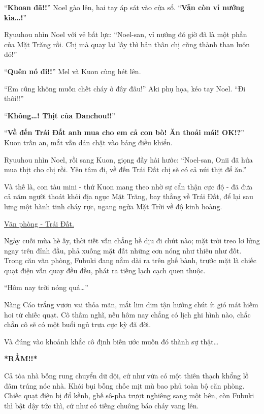 \documentclass[../main.tex]{subfiles}
\begin{document}
``\textbf{Khoan đã!!}'' Noel gào lên, hai tay áp sát vào cửa sổ. ``\textbf{Vẫn còn vỉ nướng kìa\dots!}''

Ryuuhou nhìn Noel với vẻ bất lực: ``Noel-san, vỉ nướng đó giờ đã là một phần của Mặt Trăng rồi. Chị mà quay lại lấy thì bản thân chị cũng thành than luôn đó!''

``\textbf{Quên nó đi!!}'' Mel và Kuon cùng hét lên.

``Em cũng không muốn chết cháy ở đây đâu!'' Aki phụ họa, kéo tay Noel. ``Đi thôi!!''

``\textbf{Không\dots! Thịt của Danchou!!}''

``\textbf{Về đến Trái Đất anh mua cho em cả con bò! Ăn thoải mái! OK!?}'' Kuon trấn an, mắt vẫn dán chặt vào bảng điều khiển.

Ryuuhou nhìn Noel, rồi sang Kuon, giọng đầy hài hước: ``Noel-san, Onii đã hứa mua thịt cho chị rồi. Yên tâm đi, về đến Trái Đất chị sẽ có cả núi thịt để ăn.''

Và thế là, con tàu mini - thứ Kuon mang theo nhờ sự cẩn thận cực độ - đã đưa cả năm người thoát khỏi địa ngục Mặt Trăng, bay thẳng về Trái Đất, để lại sau lưng một hành tinh cháy rực, ngang ngửa Mặt Trời về độ kinh hoàng.

\begin{center}
  \uline{Văn phòng - Trái Đất.}
\end{center}

Ngày cuối mùa hè ấy, thời tiết vẫn chẳng hề dịu đi chút nào; mặt trời treo lơ lửng ngay trên đỉnh đầu, phả xuống mặt đất những cơn nóng như thiêu như đốt. Trong căn văn phòng, Fubuki đang nằm dài ra trên ghế bành, trước mặt là chiếc quạt điện vẫn quay đều đều, phát ra tiếng lạch cạch quen thuộc.


``Hôm nay trời nóng quá\dots''

Nàng Cáo trắng vươn vai thỏa mãn, mắt lim dim tận hưởng chút ít gió mát hiếm hoi từ chiếc quạt. Cô thầm nghĩ, nếu hôm nay chẳng có lịch ghi hình nào, chắc chắn cô sẽ có một buổi ngủ trưa cực kỳ đã đời.

Và đúng vào khoảnh khắc cô định biến ước muốn đó thành sự thật\dots

{\Large \textbf{*RẦM!!*}}

Cả tòa nhà bỗng rung chuyển dữ dội, cứ như vừa có một thiên thạch khổng lồ đâm trúng nóc nhà. Khói bụi bỗng chốc mịt mù bao phủ toàn bộ căn phòng. Chiếc quạt điện bị đổ kềnh, ghế sô-pha trượt nghiêng sang một bên, còn Fubuki thì bật dậy tức thì, cứ như có tiếng chuông báo cháy vang lên.
\end{document}
